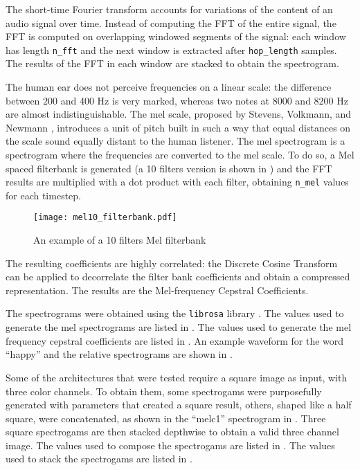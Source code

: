 The short-time Fourier transform accounts for variations of the content of an
audio signal over time. Instead of computing the FFT of the entire signal, the
FFT is computed on overlapping windowed segments of the signal: each window has
length \texttt{n\_fft} and the next window is extracted after
\texttt{hop\_length} samples.
The results of the FFT in each window are stacked to obtain the spectrogram.

The human ear does not perceive frequencies on a linear scale: the difference
between $200$ and $400$ Hz is very marked, whereas two notes at $8000$ and
$8200$ Hz are almost indistinguishable. The mel scale, proposed by Stevens,
Volkmann, and Newmann \cite{melscale1937}, introduces a unit of pitch built in
such a way that equal distances on the scale sound equally distant to the human
listener.
The mel spectrogram is a spectrogram where the frequencies are converted to the
mel scale. To do so, a Mel spaced filterbank is generated (a 10 filters version
is shown in ) and the FFT results are multiplied with
a dot product with each filter, obtaining \texttt{n\_mel} values for each
timestep.

\begin{figure}[t!]
    \centering
    \texttt{[image: mel10\_filterbank.pdf]}
    \caption{An example of a 10 filters Mel filterbank}
    \label{fig:mel10_filterbank}
\end{figure}

The resulting coefficients are highly correlated: the Discrete Cosine Transform
can be applied to decorrelate the filter bank coefficients and obtain a
compressed representation.
The results are the Mel-frequency Cepstral Coefficients.

The spectrograms were obtained using the \texttt{librosa} library
\cite{brian_mcfee_2020_3955228}.
The values used to generate the mel spectrograms are listed in
.
The values used to generate the mel frequency cepstral coefficients are listed
in .
An example waveform for the word ``happy'' and the relative spectrograms are
shown in .

Some of the architectures that were tested require a square image as input,
with three color channels.
To obtain them, some spectrogams were purposefully generated with parameters
that created a square result, others, shaped like a half square, were
concatenated, as shown in the ``melc1'' spectrogram in
.
Three square spectrogams are then stacked depthwise to obtain a valid three
channel image.
The values used to compose the spectrogams are listed in .
The values used to stack the spectrogams are listed in .

